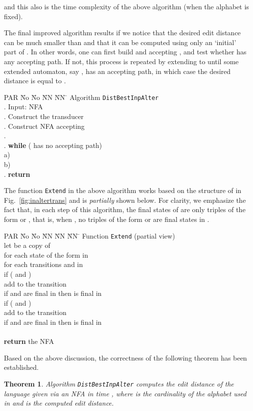 \documentclass{article}
\theoremstyle{plain}
\newtheorem{theorem}{Theorem}[]
\theoremstyle{definition}
\theoremstyle{remark}
\begin{document}
and this also is the time complexity of the above
algorithm (when the alphabet is fixed).
\par
The final improved algorithm results if we notice that
the desired edit distance can be much smaller
than  and that it can be computed
using only an `initial' part of .
In other words, one can first build  and
 accepting , and test whether  has any accepting path. If not, this
process is repeated by extending  to 
until some extended automaton, say , has an
accepting path, in which case the desired distance is
equal to .
\begin{tabbing}
PAR \= No \= No \= NN \= NN \=\kill
\> Algorithm \texttt{DistBestInpAlter} \\
.\> Input: NFA  \hspace{4mm} \\
.\> Construct the transducer  \\
.\> Construct NFA   accepting  \\
.\>  \\
. \>  \textbf{while} ( has no accepting path)\\
\>  \>  a)\> \\
\>   \> b)\>   \\
. \> \textbf{return} 
\end{tabbing}
The function \texttt{Extend} in the above algorithm works
based on the structure of  in Fig.~\ref{fig:inaltertrans} and is \emph{partially} shown below. For clarity,
we emphasize the fact that, in each step  of this algorithm, the final states of  are only
triples of the form  or , that is,
when , no triples of the form  or  are final states in .
\begin{tabbing}
PAR \= No \= No \= NN \= NN \=NN \=\kill
\> Function \texttt{Extend} (partial view)\\
\> let  be a copy of  \\
\> for each state of the form  in  \\
\> \> for each transitions  and  in  \\
\>\>\> if ( and )\\
\>\>\>\> add to  the transition \\
\>\>\>\> if  and  are final in  then
 is final in \\
\>\>\> if ( and )\\
\>\>\>\> add to  the transition \\
\>\>\>\> if  and  are final in  then
 is final in \\
\>\>\> \\
\> \textbf{return} the NFA 
\end{tabbing}
Based on the above discussion, the correctness of the following theorem has been established.
\begin{theorem}\label{th:final}
Algorithm \texttt{DistBestInpAlter} computes the
edit distance of the language given via an NFA  in
time , where  is the cardinality
of the alphabet used in  and  is the
computed edit distance.
\end{theorem}
\end{document}
